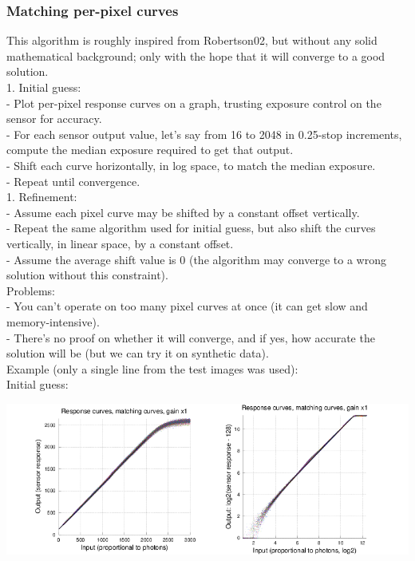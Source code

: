 {\subsubsection{Matching per-pixel curves}

This algorithm is roughly inspired from Robertson02, but without any solid mathematical background; only with the hope that it will converge to a good solution.\\

1. Initial guess:\\

- Plot per-pixel response curves on a graph, trusting exposure control on the sensor for accuracy.\\
- For each sensor output value, let's say from 16 to 2048 in 0.25-stop increments, compute the median exposure required to get that output.\\
- Shift each curve horizontally, in log space, to match the median exposure.\\
- Repeat until convergence.\\
 
1. Refinement:\\

- Assume each pixel curve may be shifted by a constant offset vertically.\\
- Repeat the same algorithm used for initial guess, but also shift the curves vertically, in linear space, by a constant offset.\\
- Assume the average shift value is 0 (the algorithm may converge to a wrong solution without this constraint).\\

Problems:\\

- You can't operate on too many pixel curves at once (it can get slow and memory-intensive).\\
- There's no proof on whether it will converge, and if yes, how accurate the solution will be (but we can try it on synthetic data).\\ 

Example (only a single line from the test images was used): \\

Initial guess:\\

\begin{center}
\includegraphics[height=5cm]{images/response-curve-test-init}
\end{center}

}
